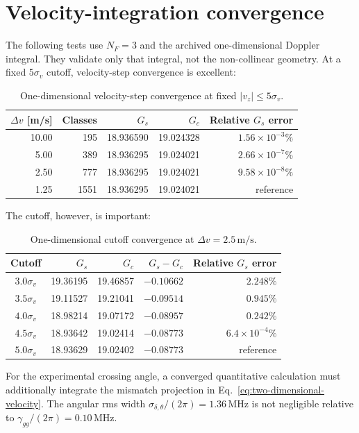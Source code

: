 \documentclass[11pt,a4paper]{article}
\newcommand{\MHz}{\,\mathrm{MHz}}
\begin{document}
\clearpage
\section{Velocity-integration convergence}

The following tests use $N_F=3$ and the archived one-dimensional Doppler
integral. They validate only that integral, not the non-collinear geometry.
At a fixed $5\sigma_v$ cutoff, velocity-step convergence is excellent:

\begin{table}[ht]
\centering
\caption{One-dimensional velocity-step convergence at fixed
$|v_z|\leq5\sigma_v$.}
\label{tab:velocity-step}
\small
\begin{tabular}{r r r r r}
\toprule
$\Delta v$ [m/s] & Classes & $G_s$ & $G_c$ &
Relative $G_s$ error\\
\midrule
10.00 & 195 & 18.936590 & 19.024328 & $1.56\times10^{-3}\%$\\
5.00  & 389 & 18.936295 & 19.024021 & $2.66\times10^{-7}\%$\\
2.50  & 777 & 18.936295 & 19.024021 & $9.58\times10^{-8}\%$\\
1.25  & 1551 & 18.936295 & 19.024021 & reference\\
\bottomrule
\end{tabular}
\end{table}

The cutoff, however, is important:

\begin{table}[ht]
\centering
\caption{One-dimensional cutoff convergence at
$\Delta v=2.5\,\mathrm{m/s}$.}
\label{tab:velocity-cutoff}
\small
\begin{tabular}{c r r r r}
\toprule
Cutoff & $G_s$ & $G_c$ & $G_s-G_c$ &
Relative $G_s$ error\\
\midrule
$3.0\sigma_v$ & 19.36195 & 19.46857 & $-0.10662$ & $2.248\%$\\
$3.5\sigma_v$ & 19.11527 & 19.21041 & $-0.09514$ & $0.945\%$\\
$4.0\sigma_v$ & 18.98214 & 19.07172 & $-0.08957$ & $0.242\%$\\
$4.5\sigma_v$ & 18.93642 & 19.02414 & $-0.08773$ & $6.4\times10^{-4}\%$\\
$5.0\sigma_v$ & 18.93629 & 19.02402 & $-0.08773$ & reference\\
\bottomrule
\end{tabular}
\end{table}

For the experimental crossing angle, a converged quantitative calculation
must additionally integrate the mismatch projection in
Eq.~\eqref{eq:two-dimensional-velocity}. The angular rms width
$\sigma_{\delta,\theta}/(2\pi)=1.36\MHz$ is not negligible relative to
$\gamma_{gg}/(2\pi)=0.10\MHz$.
\end{document}
